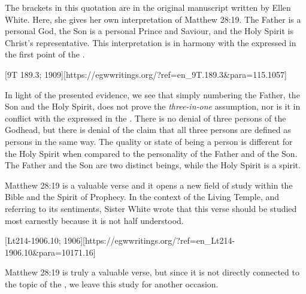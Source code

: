 The brackets in this quotation are in the original manuscript written by Ellen White. Here, she gives her own interpretation of Matthew 28:19. The Father is a personal God, the Son is a personal Prince and Saviour, and the Holy Spirit is Christ’s representative. This interpretation is in harmony with the  expressed in the first point of the .

[9T 189.3; 1909][https://egwwritings.org/?ref=en\_9T.189.3&para=115.1057]

In light of the presented evidence, we see that simply numbering the Father, the Son and the Holy Spirit, does not prove the \textit{three-in-one} assumption, nor is it in conflict with the  expressed in the . There is no denial of three persons of the Godhead, but there is denial of the claim that all three persons are defined as persons in the same way. The quality or state of being a person is different for the Holy Spirit when compared to the personality of the Father and of the Son. The Father and the Son are two distinct beings, while the Holy Spirit is a spirit.

Matthew 28:19 is a valuable verse and it opens a new field of study within the Bible and the Spirit of Prophecy. In the context of the Living Temple, and referring to its sentiments, Sister White wrote that this verse should be studied most earnestly because it is not half understood.

[Lt214-1906.10; 1906][https://egwwritings.org/?ref=en\_Lt214-1906.10&para=10171.16]

Matthew 28:19 is truly a valuable verse, but since it is not directly connected to the topic of the , we leave this study for another occasion.